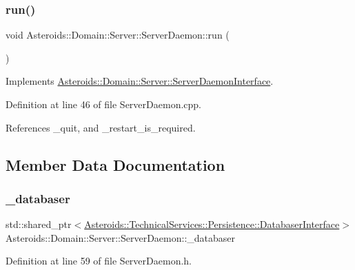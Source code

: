 \subsubsection{\texorpdfstring{run()}{run()}}
{\footnotesize\ttfamily void Asteroids\+::\+Domain\+::\+Server\+::\+Server\+Daemon\+::run (\begin{DoxyParamCaption}{ }\end{DoxyParamCaption})\hspace{0.3cm}{\ttfamily [virtual]}}



Implements \hyperlink{classAsteroids_1_1Domain_1_1Server_1_1ServerDaemonInterface_aa5e7a6e108e131fc8e99d320b826d0c1}{Asteroids\+::\+Domain\+::\+Server\+::\+Server\+Daemon\+Interface}.



Definition at line 46 of file Server\+Daemon.\+cpp.



References \+\_\+quit, and \+\_\+restart\+\_\+is\+\_\+required.



\subsection{Member Data Documentation}
\mbox{\label{classAsteroids_1_1Domain_1_1Server_1_1ServerDaemon_a2856346a9011cc7b717142527fd2a1f8}} 
\subsubsection{\texorpdfstring{\+\_\+databaser}{\_databaser}}
{\footnotesize\ttfamily std\+::shared\+\_\+ptr$<$\hyperlink{classAsteroids_1_1TechnicalServices_1_1Persistence_1_1DatabaserInterface}{Asteroids\+::\+Technical\+Services\+::\+Persistence\+::\+Databaser\+Interface}$>$ Asteroids\+::\+Domain\+::\+Server\+::\+Server\+Daemon\+::\+\_\+databaser\hspace{0.3cm}{\ttfamily [private]}}



Definition at line 59 of file Server\+Daemon.\+h.



